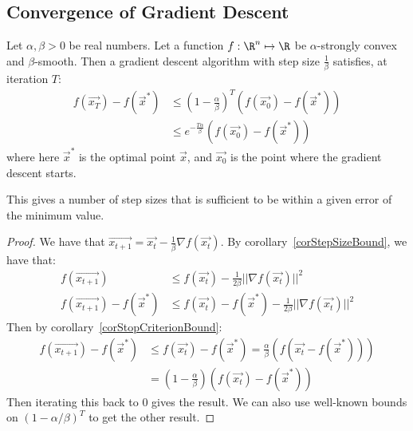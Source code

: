 \documentclass[../Main.tex]{subfiles}
\begin{document}
\subsection{Convergence of Gradient Descent}
\begin{theorem}
    Let $\alpha, \beta > 0$ be real numbers. Let a function $f : \R^n \mapsto \R$ be $\alpha$-strongly convex and $\beta$-smooth. Then a gradient descent algorithm with step size $\frac{1}{\beta}$ satisfies, at iteration $T$:
    \begin{align}
        f(\vec{x_T}) - f(\vec{x}^*) &\leq \left(1 - \frac{\alpha}{\beta}\right)^T (f(\vec{x_0}) - f(\vec{x}^*)) \label{eqnGradDescConvergence} \\
        &\leq e^{-\frac{T\alpha}{\beta}} \left(f(\vec{x_0}) - f(\vec{x}^*)\right) \nonumber
    \end{align}
    where here $\vec{x}^*$ is the optimal point $\vec{x}$, and $\vec{x_0}$ is the point where the gradient descent starts.
    \label{thmGradDescConvergence}
\end{theorem}
\begin{remark}
    This gives a number of step sizes that is sufficient to be within a given error of the minimum value.
\end{remark}
\begin{proof}
    We have that $\vec{x_{t + 1}} = \vec{x_t} - \frac{1}{\beta} \nabla f(\vec{x_t})$. By corollary~\ref{corStepSizeBound}, we have that:
    \begin{align*}
        f(\vec{x_{t+1}}) &\leq f(\vec{x_t}) - \frac{1}{2\beta} ||\nabla f(\vec{x_t})||^2 \\
        f(\vec{x_{t+1}}) - f(\vec{x}^*) &\leq f(\vec{x_t}) - f(\vec{x}^*) - \frac{1}{2\beta} ||\nabla f(\vec{x_t})||^2
    \end{align*}
    Then by corollary~\ref{corStopCriterionBound}:
    \begin{align*}
        f(\vec{x_{t+1}}) - f(\vec{x}^*) &\leq f(\vec{x_t}) - f(\vec{x}^*) = \frac{\alpha}{\beta} (f(\vec{x_t}-f(\vec{x}^*))) \\
        &= \left(1-\frac{\alpha}{\beta}\right) (f(\vec{x_t}) - f(\vec{x}^*))
    \end{align*}
    Then iterating this back to 0 gives the result. We can also use well-known bounds on $(1 - \alpha / \beta)^T$ to get the other result.
\end{proof}
\end{document}
